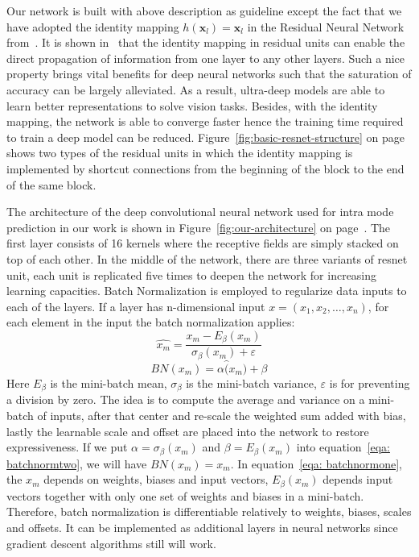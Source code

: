 Our network is built with above description as guideline except the 
fact that we have adopted the identity mapping 
\(h(\mathbf{x}_l)=\mathbf{x}_l\) in the Residual 
Neural Network from~\parencite{RN67}.
It is shown in~\parencite{RN68} that
the identity mapping in residual units
can enable the direct propagation of information
from one layer to any other layers.
Such a nice property brings vital benefits
for deep neural networks such that the saturation of accuracy
can be largely alleviated.
As a result, ultra-deep models are able to
learn better representations to solve
vision tasks.
Besides, with the identity mapping, the network
is able to converge faster hence the training time
required to train a deep model can be reduced.
Figure~\ref{fig:basic-resnet-structure} on 
page~\pageref{fig:basic-resnet-structure}
shows two types
of the residual units in which the identity mapping
is implemented by shortcut connections from 
the beginning of the block
to the end of the same block.

The architecture of the deep convolutional neural 
network used for intra mode prediction in our work
is shown in Figure~\ref{fig:our-architecture} on
page~\pageref{fig:our-architecture}.
The first layer consists of 16 kernels where
the receptive fields are 
simply stacked on top of each other.
In the middle of the network, there are
three variants of resnet unit, each unit
is replicated five times to deepen the network
for increasing learning capacities.
Batch Normalization is employed to regularize
data inputs to each of the layers.
If a layer has n-dimensional input
\(x = (x_1, x_2, \ldots, x_n)\),
for each element in the input the batch 
normalization applies:
\begin{equation}
    \label{eqa: batchnormone}
    \hat{x_m} = \frac{x_m - E_\beta(x_m)}{\sigma_\beta(x_m) + \varepsilon}
\end{equation}
\begin{equation}
    \label{eqa: batchnormtwo}
    BN(x_m) = \alpha \hat(x_m) + \beta
\end{equation}
Here \(E_\beta \) is the mini-batch mean,
\(\sigma_\beta \) is the mini-batch variance,
\(\varepsilon \) is for preventing a division by zero.
The idea is to compute the average and variance on a 
mini-batch of inputs, after that center and re-scale
the weighted sum added with bias, lastly the
learnable scale and offset are placed into
the network to restore expressiveness.
If we put \(\alpha = \sigma_\beta(x_m)\) and 
\(\beta = E_\beta(x_m)\) into 
equation~\ref{eqa: batchnormtwo},
we will have \(BN(x_m) = x_m\).
In equation~\ref{eqa: batchnormone},
the \(x_m\) depends on weights, biases and 
input vectors, \(E_\beta(x_m)\) depends 
input vectors together with
only one set of weights and biases
in a mini-batch.
Therefore, batch normalization is differentiable 
relatively 
to weights, biases, scales and offsets.
It can be implemented as additional layers in neural networks
since gradient descent algorithms still will work.

